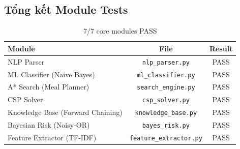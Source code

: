 \subsection{Tổng kết Module Tests}

\begin{table}[H]
\centering
\begin{tabular}{|l|c|c|}
\hline
\textbf{Module} & \textbf{File} & \textbf{Result} \\
\hline
NLP Parser & \texttt{nlp\_parser.py} & PASS \\
\hline
ML Classifier (Naive Bayes) & \texttt{ml\_classifier.py} & PASS \\
\hline
A* Search (Meal Planner) & \texttt{search\_engine.py} & PASS \\
\hline
CSP Solver & \texttt{csp\_solver.py} & PASS \\
\hline
Knowledge Base (Forward Chaining) & \texttt{knowledge\_base.py} & PASS \\
\hline
Bayesian Risk (Noisy-OR) & \texttt{bayes\_risk.py} & PASS \\
\hline
Feature Extractor (TF-IDF) & \texttt{feature\_extractor.py} & PASS \\
\hline
\end{tabular}
\caption{7/7 core modules PASS}
\label{tab:tests}
\end{table}
